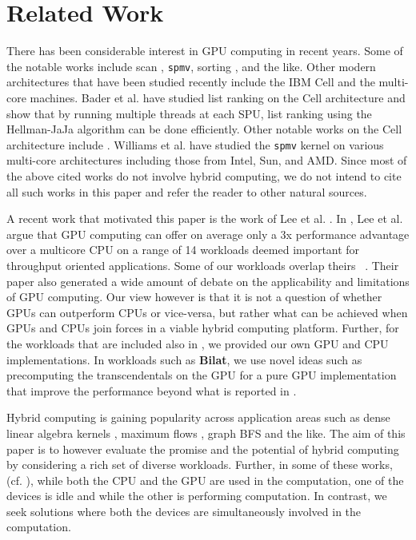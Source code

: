 \documentclass[11pt]{article}
\newcommand{\spmv} {{\tt spmv}}
\newcommand{\bilat} {{\bf Bilat}}
\begin{document}
\section{Related Work}
\label{sec:related}
There has been considerable interest in GPU computing in recent years. Some
of the notable works include scan \cite{scan}, \spmv \cite{BG09},
sorting \cite{sanders10}, and the like. Other modern
architectures  that have been studied recently 
include the IBM Cell and the multi-core machines. Bader et al.
\cite{bader} have studied list ranking on the Cell architecture
and show that by running multiple threads at each SPU, list ranking
using the Hellman-JaJa algorithm can be done efficiently. Other notable
works on the Cell architecture include \cite{cellBFS,vuduc07}. Williams et
al. \cite{vuduc07} have studied the {\tt spmv} kernel on
various multi-core architectures including those from Intel, Sun, and
AMD. Since most of the above cited works do not involve hybrid computing, 
we do not intend to cite all such works in this paper and refer the 
reader to other natural sources. 

A recent work that motivated this paper is the work of Lee et al.
\cite{isca10}.
In \cite{isca10}, Lee et al. argue that GPU computing can offer on average
only a 3x performance advantage over a multicore CPU on a range of 14
workloads deemed important for throughput oriented applications. Some of
our workloads overlap theirs ~\cite{isca10}. Their
paper also generated a wide amount of debate on the applicability and limitations
of GPU computing. Our view however is that it is not a question of whether
GPUs can outperform CPUs or vice-versa, but rather what can be achieved
when GPUs and CPUs join forces in a viable hybrid computing platform. 
Further, for the workloads that are included also in \cite{isca10}, we
provided our own GPU and CPU implementations. In workloads such as \bilat, 
we use novel ideas such as precomputing the transcendentals on the
GPU for a pure GPU implementation  that improve the performance beyond what is
reported in \cite{isca10}.


Hybrid computing is gaining popularity across application areas such as
dense linear algebra kernels \cite{BDT08,dongarra2009,AICCSA11}, maximum flows
\cite{hong09},  graph BFS
\cite{kunle11} and the like. The aim
of this paper is to however evaluate the promise and the potential of
hybrid computing by considering a rich set of diverse workloads. 
Further, in some of these works, (cf.
\cite{kunle11,hong09,WJ10}), while both the CPU
and the GPU are used in the computation, one of the devices is idle and
while the other is performing computation. In contrast, we seek
solutions where both the devices are simultaneously involved in the
computation.
\end{document}
